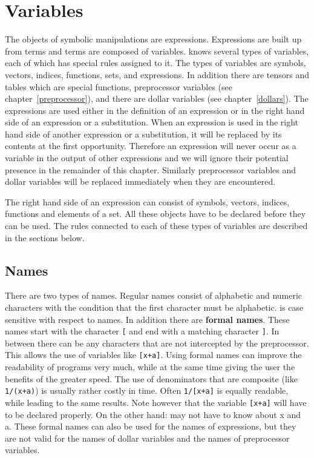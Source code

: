 
\chapter{Variables}
\label{variables}

The objects of symbolic manipulations are expressions. 
Expressions are built up from terms and terms are composed of 
variables. {\FORM} knows several types of variables, each 
of which has special rules assigned to it. The types of variables are 
symbols, vectors, indices, functions, sets, and expressions. In addition 
there are tensors and tables which are special functions, preprocessor 
variables (see chapter~\ref{preprocessor}),
and there are dollar variables (see 
chapter~\ref{dollars}). The expressions are used either in the definition 
of an expression or in the right hand side of an expression or a 
substitution. When an expression is used in the right hand side of another 
expression or a substitution, it will be replaced by its contents at the 
first opportunity. Therefore an expression will never occur as a variable 
in the output of other expressions and we will ignore their potential 
presence in the remainder of this chapter. Similarly preprocessor variables 
and  dollar variables will be replaced immediately when they are 
encountered.

The right hand side of an expression can consist of symbols, vectors, 
indices, functions and elements of a set. All these objects have to be 
declared before they can be used. The rules 
connected to each of these types of variables are described in the 
sections below.

\section{Names}

There are two types of names. Regular 
names consist of alphabetic and numeric characters 
with the condition that the first character must be alphabetic. {\FORM} is 
case sensitive with respect to names. In addition there are {\bf formal 
names}. These names start with the character \verb:[: and end with a 
matching character \verb:]:. In between there can be any characters that 
are not intercepted by the preprocessor. This allows the use of variables 
like \verb:[x+a]:. Using formal names can improve the readability of 
programs very much, while at the same time giving the user the benefits of 
the greater speed. The use of denominators that are 
composite (like \verb:1/(x+a):) is usually rather costly in time. Often 
\verb:1/[x+a]: is equally readable, while leading to the same results. Note 
however that the variable \verb:[x+a]: will have to be declared properly. 
On the other hand: {\FORM} may not have to know about x and a. These formal 
names can also be used for the names of expressions, but they are not valid 
for the names of dollar variables and the names of 
preprocessor variables.

